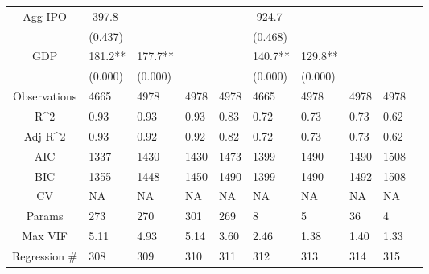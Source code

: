 \documentclass{article}
\begin{document}
\begin{table}[H]
\begin{tabular}{|clllllllll|}
  Agg IPO & -397.8 &  &  &  & -924.7 &  &  &  & \\
   & (0.437) &  &  &  & (0.468) &  &  &  & \\
  GDP & 181.2** & 177.7** &  &  & 140.7** & 129.8** &  &  & \\
   & (0.000) & (0.000) &  &  & (0.000) & (0.000) &  &  & \\
  \hline
 Observations & 4665 & 4978 & 4978 & 4978 & 4665 & 4978 & 4978 & 4978 & \\
  R^2 & 0.93 & 0.93 & 0.93 & 0.83 & 0.72 & 0.73 & 0.73 & 0.62 & \\
  Adj R^2 & 0.93 & 0.92 & 0.92 & 0.82 & 0.72 & 0.73 & 0.73 & 0.62 & \\
  AIC & 1337 & 1430 & 1430 & 1473 & 1399 & 1490 & 1490 & 1508 & \\
  BIC & 1355 & 1448 & 1450 & 1490 & 1399 & 1490 & 1492 & 1508 & \\
  CV & NA & NA & NA & NA & NA & NA & NA & NA & \\
  Params & 273 & 270 & 301 & 269 & 8 & 5 & 36 & 4 & \\
  Max VIF & 5.11 & 4.93 & 5.14 & 3.60 & 2.46 & 1.38 & 1.40 & 1.33 & \\
  Regression \# & 308 & 309 & 310 & 311 & 312 & 313 & 314 & 315 & \\
   \hline
\end{tabular}

\end{table}
\end{document}

